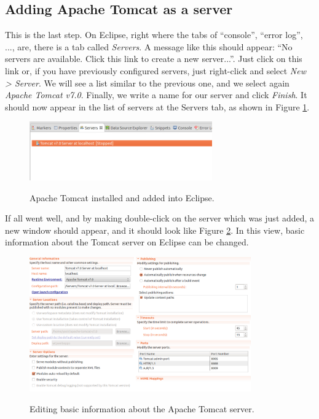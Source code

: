 \documentclass[a4paper,11pt]{book}
\begin{document}
\subsection{Adding Apache Tomcat as a server}
\label{subsec:addserver}

This is the last step. On Eclipse, right where the tabs of ``console'', ``error log'', ..., are, there is a tab called \textit{Servers}. A message like this should appear: ``No servers are available. Click this link to create a new server...''. Just click on this link or, if you have previously configured servers, just right-click and select \textit{New > Server}. We will see a list similar to the previous one, and we select again \textit{Apache Tomcat v7.0}. Finally, we write a name for our server and click \textit{Finish}. It should now appear in the list of servers at the Servers tab, as shown in Figure \ref{fig:createdtomcat}.

\begin{figure}
  \begin{center}
    \includegraphics[width=0.7\textwidth]{./Figures/createdtomcat.png}
    \label{fig:createdtomcat}
    \caption{Apache Tomcat installed and added into Eclipse.}
  \end{center}
\end{figure}

If all went well, and by making double-click on the server which was just added, a new window should appear, and it should look like Figure \ref{fig:serverconfig}. In this view, basic information about the Tomcat server on Eclipse can be changed.

\begin{figure}
  \begin{center}
    \includegraphics[width=0.85\textwidth]{./Figures/serverconfig.png}
    \label{fig:serverconfig}
    \caption{Editing basic information about the Apache Tomcat server.}
  \end{center}
\end{figure}
\end{document}
